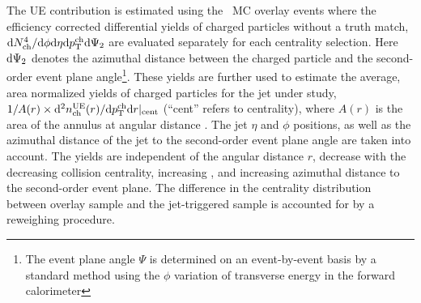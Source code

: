 The UE contribution is estimated using the \PbPb\ MC overlay events where the efficiency corrected differential yields of charged particles without a truth match, $\mathrm{d}N^{4}_{\mathrm{ch}}/\mathrm{d}\phi\mathrm{d}\eta\mathrm{d}\mbox{$p_{\mathrm{T}}^{\mathrm{ch}}$}\mathrm{d}\Psi_{2}$ are evaluated separately for
each centrality selection. Here $\mathrm{d} \Psi_{2}$ denotes the azimuthal distance between the charged particle and the second-order event plane angle\footnote{The event plane angle $\Psi$ is determined on an event-by-event basis by a standard method using the $\phi$ variation of transverse energy in the forward calorimeter}. 
These yields are further used to estimate the average, area normalized yields of charged particles for the jet under study, \mbox{$1/A(r) \times \mathrm{d}^2 \mbox{$n_{\mathrm{ch}}^{\mathrm{UE}}$}(r) / \mathrm{d} \mbox{$p_{\mathrm{T}}^{\mathrm{ch}}$} \mathrm{d} r|_{\mathrm{cent}}$} (``cent'' refers to centrality), where $A(r)$ is the area of the annulus at angular distance \rvar. The jet $\eta$ and $\phi$ positions, as well as the azimuthal distance of the jet to the second-order event plane angle are taken into account. The yields are independent of the angular distance $r$, decrease with the decreasing collision centrality, increasing \pttrk, and increasing azimuthal distance to the second-order event plane. The difference in the centrality distribution between overlay sample and the jet-triggered sample is accounted for by a reweighing procedure.


